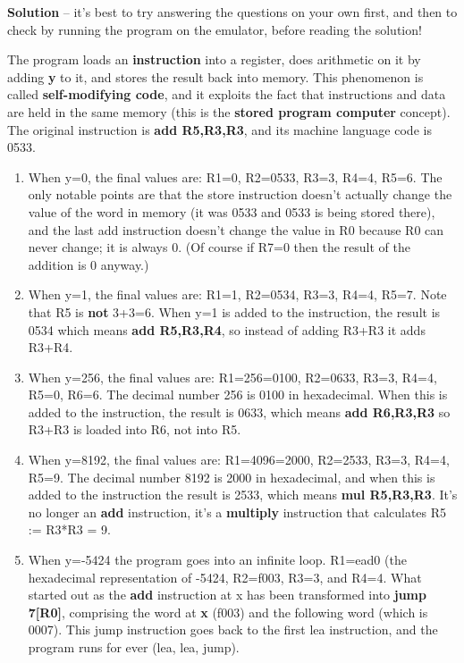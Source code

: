 \documentclass[11pt]{article}
\begin{document}
\begin{itemize}
\textbf{Solution} -- it's best to try answering the questions on your own
first, and then to check by running the program on the emulator,
before reading the solution!

The program loads an \textbf{instruction} into a register, does arithmetic on
it by adding \textbf{y} to it, and stores the result back into memory.  This
phenomenon is called \textbf{self-modifying code}, and it exploits the fact
that instructions and data are held in the same memory (this is the
\textbf{stored program computer} concept).  The original instruction is \textbf{add
R5,R3,R3}, and its machine language code is 0533.

\begin{enumerate}
\item When y=0, the final values are: R1=0, R2=0533, R3=3, R4=4, R5=6.
The only notable points are that the store instruction doesn't
actually change the value of the word in memory (it was 0533 and
0533 is being stored there), and the last add instruction doesn't
change the value in R0 because R0 can never change; it is always 0.
(Of course if R7=0 then the result of the addition is 0 anyway.)

\item When y=1, the final values are: R1=1, R2=0534, R3=3, R4=4, R5=7.
Note that R5 is \textbf{not} 3+3=6.  When y=1 is added to the instruction,
the result is 0534 which means \textbf{add R5,R3,R4}, so instead of adding
R3+R3 it adds R3+R4.

\item When y=256, the final values are: R1=256=0100, R2=0633, R3=3, R4=4,
R5=0, R6=6. The decimal number 256 is 0100 in hexadecimal.  When
this is added to the instruction, the result is 0633, which means
\textbf{add R6,R3,R3} so R3+R3 is loaded into R6, not into R5.

\item When y=8192, the final values are: R1=4096=2000, R2=2533, R3=3,
R4=4, R5=9.  The decimal number 8192 is 2000 in hexadecimal, and
when this is added to the instruction the result is 2533, which
means \textbf{mul R5,R3,R3}.  It's no longer an \textbf{add} instruction, it's a
\textbf{multiply} instruction that calculates R5 := R3*R3 = 9.

\item When y=-5424 the program goes into an infinite loop. R1=ead0 (the
hexadecimal representation of -5424, R2=f003, R3=3, and R4=4.  What
started out as the \textbf{add} instruction at x has been transformed into
\textbf{jump 7[R0]}, comprising the word at \textbf{x} (f003) and the following
word (which is 0007).  This jump instruction goes back to the first
lea instruction, and the program runs for ever (lea, lea, jump).
\end{enumerate}


\end{itemize}
\end{document}
